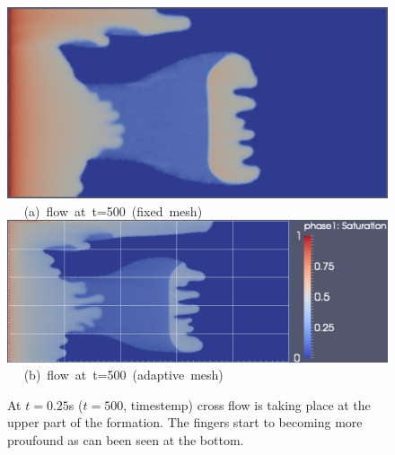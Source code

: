 \begin{landscape}
\begin{figure}[ht] 
\vbox{
\hbox{\hspace{3.5cm}
\includegraphics[width=.65\textwidth]{./Pics1/mr10_5regions_fixed/5regions_fixed_500.pdf} 
}
\vspace{0.0cm}
\hbox{\hspace{6.5cm} (a) flow at t=500 (fixed mesh)   
}
\vspace{0.25cm}
\hbox{\hspace{3.5cm}
\includegraphics[width=.9\textwidth]{./Pics1/mr10_5regions_adapt/5regions_adapt_500_1.pdf}
}
\vspace{0.0cm}
\hbox{\hspace{6.5cm} (b) flow at t=500 (adaptive mesh)     
}
}     
\caption{At $t=0.25$s ($t=500$, timestemp) cross flow is taking place at the upper part of the formation. The fingers start to becoming more proufound as can been seen at the bottom.}
\label{fig:2testcase_b}
\end{figure}
\end{landscape}
\clearpage



